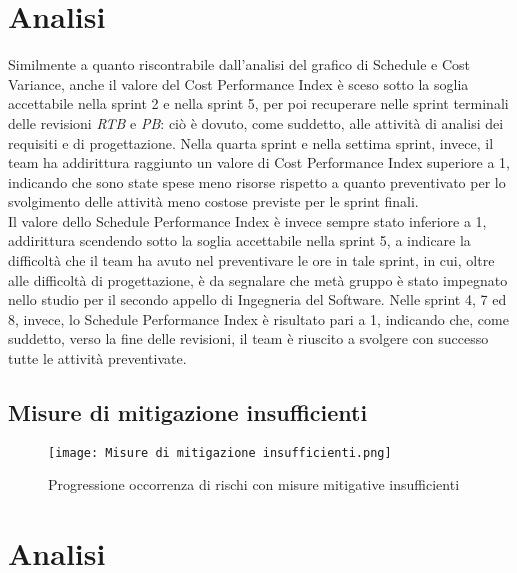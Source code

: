 \section*{Analisi}

Similmente a quanto riscontrabile dall’analisi del grafico di Schedule e Cost Variance, anche
il valore del Cost Performance Index è sceso sotto la soglia accettabile nella 
sprint 2 e nella sprint 5, per poi recuperare nelle sprint terminali delle revisioni \emph{RTB} e \emph{PB}: ciò è dovuto, come suddetto, alle attività di analisi dei requisiti e di progettazione. Nella quarta sprint e nella settima sprint, invece, il team
ha addirittura raggiunto un valore di Cost Performance Index superiore a 1, indicando
che sono state spese meno risorse rispetto a quanto preventivato per lo svolgimento delle
attività meno costose previste per le sprint finali.\\
Il valore dello Schedule Performance Index è invece sempre stato inferiore a 1, addirittura scendendo sotto la soglia accettabile nella sprint 5, a indicare la difficoltà che il team ha avuto nel preventivare le ore in tale sprint, in cui, oltre alle difficoltà di progettazione, è da segnalare che metà gruppo è stato impegnato nello studio per il secondo appello di Ingegneria del Software.
Nelle sprint 4, 7 ed 8, invece, lo Schedule Performance Index è risultato pari a 1, indicando che, come suddetto, verso la fine delle revisioni, il team è riuscito a svolgere
con successo tutte le attività preventivate.

\newpage

\subsection{Misure di mitigazione insufficienti}
\label{subsec:Misure di mitigazione insufficienti}

\begin{figure}[h] 
    \centering
    \texttt{[image: Misure di mitigazione insufficienti.png]}
    \caption{Progressione occorrenza di rischi con misure mitigative insufficienti} 
    \label{fig: Misure di mitigazione insufficienti}
\end{figure}

\section*{Analisi}

